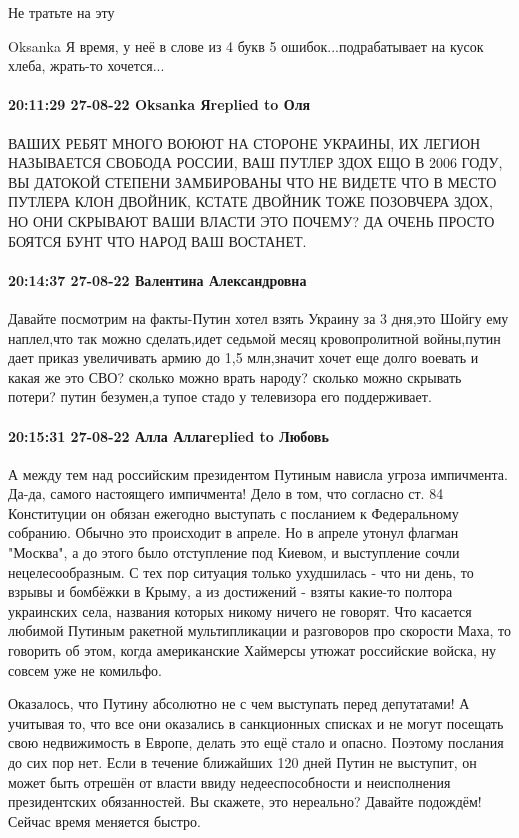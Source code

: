 Не тратьте на эту 

Oksanka Я время, у неё в слове из 4 букв 5 ошибок...подрабатывает на кусок хлеба, жрать-то хочется...

\paragraph{20:11:29 27-08-22 Oksanka Яreplied to Оля}

ВАШИХ РЕБЯТ МНОГО ВОЮЮТ НА СТОРОНЕ УКРАИНЫ, ИХ ЛЕГИОН НАЗЫВАЕТСЯ СВОБОДА
РОССИИ, ВАШ ПУТЛЕР ЗДОХ ЕЩО В 2006 ГОДУ, ВЫ ДАТОКОЙ СТЕПЕНИ ЗАМБИРОВАНЫ ЧТО НЕ
ВИДЕТЕ ЧТО В МЕСТО ПУТЛЕРА КЛОН ДВОЙНИК, КСТАТЕ ДВОЙНИК ТОЖЕ ПОЗОВЧЕРА ЗДОХ, НО
ОНИ СКРЫВАЮТ ВАШИ ВЛАСТИ ЭТО ПОЧЕМУ? ДА ОЧЕНЬ ПРОСТО БОЯТСЯ БУНТ ЧТО НАРОД ВАШ
ВОСТАНЕТ.

\paragraph{20:14:37 27-08-22 Валентина Александровна}

Давайте посмотрим на факты-Путин хотел взять Украину за 3 дня,это Шойгу ему
наплел,что так можно сделать,идет седьмой месяц кровопролитной войны,путин дает
приказ увеличивать армию до 1,5 млн,значит хочет еще долго воевать и какая же
это СВО? сколько можно врать народу? сколько можно скрывать потери? путин
безумен,а тупое стадо у телевизора его поддерживает.

\paragraph{20:15:31 27-08-22 Алла Аллаreplied to Любовь}

А между тем над российским президентом Путиным нависла угроза импичмента.
Да-да, самого настоящего импичмента! Дело в том, что согласно ст. 84
Конституции он обязан ежегодно выступать с посланием к Федеральному собранию.
Обычно это происходит в апреле. Но в апреле утонул флагман "Москва", а до этого
было отступление под Киевом, и выступление сочли нецелесообразным. С тех пор
ситуация только ухудшилась - что ни день, то взрывы и бомбёжки в Крыму, а из
достижений - взяты какие-то полтора украинских села, названия которых никому
ничего не говорят. Что касается любимой Путиным ракетной мультипликации и
разговоров про скорости Маха, то говорить об этом, когда американские Хаймерсы
утюжат российские войска, ну совсем уже не комильфо.

Оказалось, что Путину абсолютно не с чем выступать перед депутатами! А учитывая
то, что все они оказались в санкционных списках и не могут посещать свою
недвижимость в Европе, делать это ещё стало и опасно. Поэтому послания до сих
пор нет.
Если в течение ближайших 120 дней Путин не выступит, он может быть отрешён от власти ввиду недееспособности и неисполнения президентских обязанностей. Вы скажете, это нереально? Давайте подождём! Сейчас время меняется быстро.

